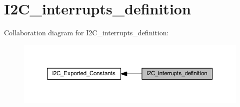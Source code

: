 \hypertarget{group___i2_c__interrupts__definition}{}\section{I2\+C\+\_\+interrupts\+\_\+definition}
\label{group___i2_c__interrupts__definition}
Collaboration diagram for I2\+C\+\_\+interrupts\+\_\+definition\+:
\nopagebreak
\begin{figure}[H]
\begin{center}
\leavevmode
\includegraphics[width=350pt]{group___i2_c__interrupts__definition}
\end{center}
\end{figure}
